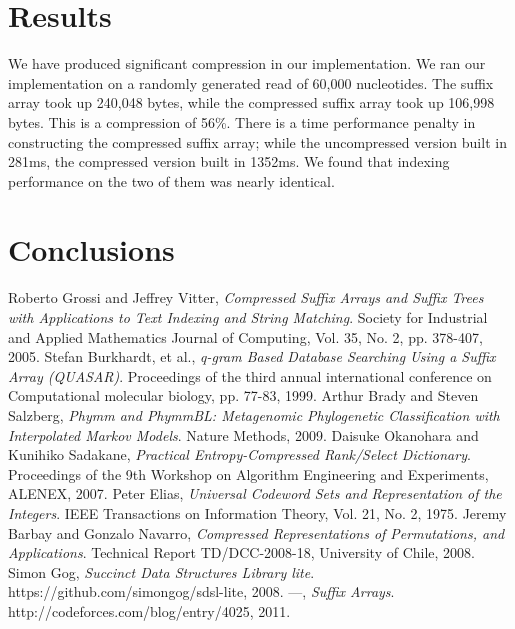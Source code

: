 \documentclass{article}
\begin{document}
\section{Results}
\label{sec-results}
We have produced significant compression in our implementation. We ran our implementation on a randomly generated read of 60,000 nucleotides. The suffix array took up 240,048 bytes, while the compressed suffix array took up 106,998 bytes. This is a compression of 56\%. There is a time performance penalty in constructing the compressed suffix array; while the uncompressed version built in 281ms, the compressed version built in 1352ms. We found that indexing performance on the two of them was nearly identical.\\
\section{Conclusions}
\label{sec-conclusions}

\begin{thebibliography}{1}
	Roberto Grossi and Jeffrey Vitter,
	\emph{Compressed Suffix Arrays and Suffix Trees with Applications to Text Indexing and String Matching}.
	Society for Industrial and Applied Mathematics Journal of Computing,
	Vol. 35, No. 2, pp. 378-407,
	2005.
	Stefan Burkhardt, et al.,
	\emph{q-gram Based Database Searching Using a Suffix Array (QUASAR)}.
	Proceedings of the third annual international conference on Computational molecular biology,
	pp. 77-83,
	1999.
	Arthur Brady and Steven Salzberg,
	\emph{Phymm and PhymmBL: Metagenomic Phylogenetic Classification with Interpolated Markov Models}.
	Nature Methods,
	2009.
	Daisuke Okanohara and Kunihiko Sadakane,
	\emph{Practical Entropy-Compressed Rank/Select Dictionary}. 
	Proceedings of the 9th Workshop on Algorithm Engineering and Experiments,
	ALENEX,
	2007.
	Peter Elias,
	\emph{Universal Codeword Sets and Representation of the Integers}.
	IEEE Transactions on Information Theory,
	Vol. 21, No. 2,
	1975.
	Jeremy Barbay and Gonzalo Navarro,
	\emph{Compressed Representations of Permutations, and Applications}.
	Technical Report TD/DCC-2008-18,
	University of Chile,
	2008.
	Simon Gog,
	\emph{Succinct Data Structures Library lite}.
	https://github.com/simongog/sdsl-lite,
	2008.
	---,
	\emph{Suffix Arrays}.
	http://codeforces.com/blog/entry/4025,
	2011.
\end{thebibliography}
\end{document}
